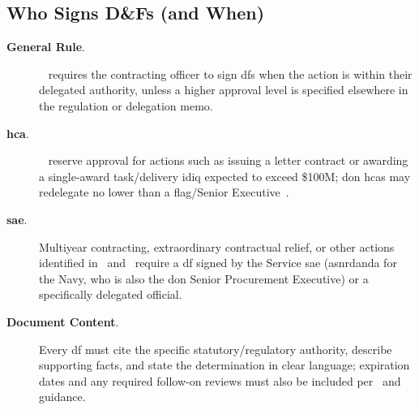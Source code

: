 \documentclass[../main.tex]{subfiles}
\begin{document}
\subsection{Who Signs D\&Fs (and When)}
\begin{description}
\item[\textbf{General Rule}.]~\autocite[\S~1.704]{FAR} requires the contracting officer to sign \acp{df} when the action is within their delegated authority, unless a higher approval level is specified elsewhere in the regulation or delegation memo.
\item[\textbf{\ac{hca}}.]~\autocite[\S\S~16.603-3, 16.504(c)(1)(ii)(D)]{FAR} reserve approval for actions such as issuing a letter contract or awarding a single-award task/delivery \ac{idiq} expected to exceed \$100M; \ac{don} \acp{hca} may redelegate no lower than a flag/Senior Executive~\autocite[\S~5201.707]{NMCARS}.
\item[\textbf{\ac{sae}}.] Multiyear contracting, extraordinary contractual relief, or other actions identified in~\autocite[\S~17.105-1]{FAR} and~\autocite[\S~217.172]{DFARS} require a \ac{df} signed by the Service \ac{sae} (\ac{asnrdanda} for the Navy, who is also the \ac{don} Senior Procurement Executive) or a specifically delegated official.
\item[\textbf{Document Content}.] Every \ac{df} must cite the specific statutory/regulatory authority, describe supporting facts, and state the determination in clear language; expiration dates and any required follow-on reviews must also be included per~\autocite[\S~1.707]{FAR} and~\autocite[\S~5201.707]{NMCARS} guidance.
\end{description}
\end{document}
